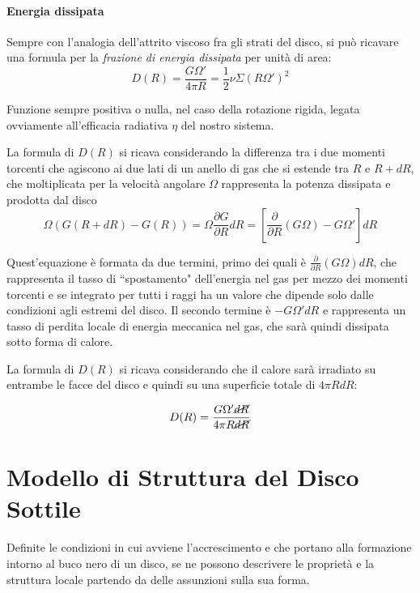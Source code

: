 \documentclass[a4paperbi]{article}
\begin{document}
	\paragraph{Energia dissipata}
	Sempre con l'analogia dell'attrito viscoso fra gli strati del disco, si può ricavare una formula per la \textit{frazione di energia dissipata} per unità di area:
	\begin{equation}
		D(R)=\frac{G\Omega'}{4\pi R}=\frac{1}{2}\nu\Sigma(R\Omega')^2
	\end{equation}
	
	Funzione sempre positiva o nulla, nel caso della rotazione rigida, legata ovviamente all'efficacia radiativa $\eta$ del nostro sistema.
	
	La formula di $D(R)$ si ricava considerando la differenza tra i due momenti torcenti che agiscono ai due lati di un anello di gas che si estende tra $R$ e $R+dR$, che moltiplicata per la velocità angolare $\Omega$ rappresenta la potenza dissipata e prodotta dal disco
	\begin{equation}
		\Omega(G(R+dR)-G(R))=\Omega\frac{\partial G}{\partial R}dR=\left[\frac{\partial}{\partial R}(G\Omega)-G\Omega'\right]dR
	\end{equation}
	
	Quest'equazione è formata da due termini, primo dei quali è $\frac{\partial}{\partial R}(G\Omega)dR$, che rappresenta il tasso di ``spostamento" dell'energia nel gas per mezzo dei momenti torcenti e se integrato per tutti i raggi ha un valore che dipende solo dalle condizioni agli estremi del disco. Il secondo termine è $-G\Omega'dR$ e rappresenta un tasso di perdita locale di energia meccanica nel gas, che sarà quindi dissipata sotto forma di calore.
	
	La formula di $D(R)$ si ricava considerando che il calore sarà irradiato su entrambe le facce del disco e quindi su una superficie totale di $4\pi RdR$:
	
	\begin{equation}
		D(R)=\frac{G\Omega'\cancel{dR}}{4\pi R\cancel{dR}}
	\end{equation}
	
\newpage
\section{Modello di Struttura del Disco Sottile}
	Definite le condizioni in cui avviene l'accrescimento e che portano alla formazione intorno al buco nero di un disco, se ne possono descrivere le proprietà e la struttura locale partendo da delle assunzioni sulla sua forma. 
	
\end{document}
